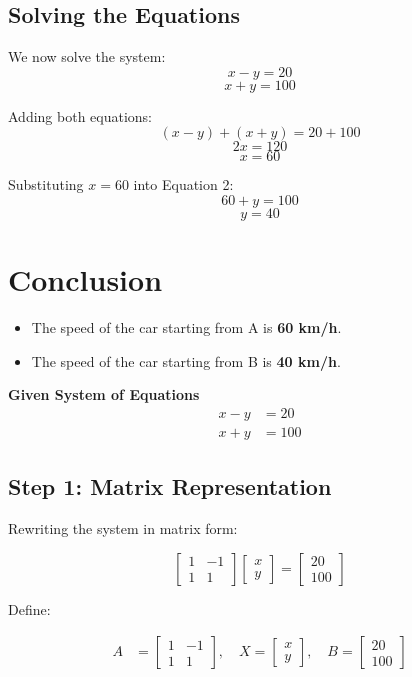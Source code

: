 \documentclass[journal]{IEEEtran}
\begin{document}
\subsection*{Solving the Equations}
We now solve the system:
\[
x - y = 20
\]
\[
x + y = 100
\]

Adding both equations:
\[
(x - y) + (x + y) = 20 + 100
\]
\[
2x = 120
\]
\[
x = 60
\]

Substituting \( x = 60 \) into Equation 2:
\[
60 + y = 100
\]
\[
y = 40
\]

\section*{Conclusion}
\begin{itemize}
    \item The speed of the car starting from A is \textbf{60 km/h}.
    \item The speed of the car starting from B is \textbf{40 km/h}.
\end{itemize}


\textbf{Given System of Equations}
\begin{align}
    x - y &= 20 \label{eq1}\\
    x + y &= 100 \label{eq2}
\end{align}

\subsection{Step 1: Matrix Representation}
Rewriting the system in matrix form:

\begin{equation}
    \begin{bmatrix} 
        1 & -1 \\ 
        1 & 1 
    \end{bmatrix}
    \begin{bmatrix} 
        x \\ y 
    \end{bmatrix} =
    \begin{bmatrix} 
        20 \\ 100 
    \end{bmatrix}
\end{equation}

Define:

\begin{align}
    A &= \begin{bmatrix} 1 & -1 \\ 1 & 1 \end{bmatrix}, \quad
    X = \begin{bmatrix} x \\ y \end{bmatrix}, \quad
    B = \begin{bmatrix} 20 \\ 100 \end{bmatrix}
\end{align}
\end{document}
